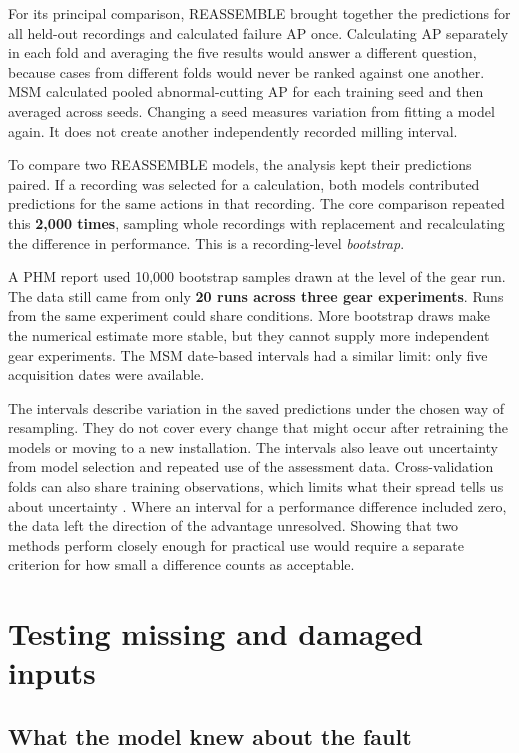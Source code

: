 For its principal comparison, REASSEMBLE brought together the predictions for all
held-out recordings and calculated failure AP once. Calculating AP separately in each
fold and averaging the five results would answer a different question, because cases
from different folds would never be ranked against one another. MSM calculated pooled
abnormal-cutting AP for each training seed and then averaged across seeds. Changing a
seed measures variation from fitting a model again. It does not create another
independently recorded milling interval.

To compare two REASSEMBLE models, the analysis kept their predictions paired. If a
recording was selected for a calculation, both models contributed predictions for the
same actions in that recording. The core comparison repeated this \textbf{2,000 times},
sampling whole recordings with replacement and recalculating the difference in
performance. This is a recording-level \emph{bootstrap}.

A PHM report used 10,000 bootstrap samples drawn at the level of the gear run. The data
still came from only \textbf{20 runs across three gear experiments}. Runs from the same
experiment could share conditions. More bootstrap draws make the numerical estimate more
stable, but they cannot supply more independent gear experiments. The MSM date-based
intervals had a similar limit: only five acquisition dates were available.

The intervals describe variation in the saved predictions under the chosen way of
resampling. They do not cover every change that might occur after retraining the models
or moving to a new installation. The intervals also leave out uncertainty from model
selection and repeated use of the assessment data. Cross-validation folds can also share
training observations, which limits what their spread tells us about uncertainty
\parencite{Bengio2004CVVariance}. Where an interval for a performance difference
included zero, the data left the direction of the advantage unresolved. Showing that two
methods perform closely enough for practical use would require a separate criterion for
how small a difference counts as acceptable.

\section{Testing missing and damaged inputs}
\label{sec:ch4-robustness}

\subsection{What the model knew about the fault}

